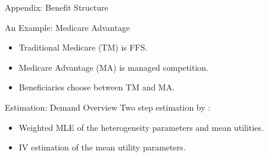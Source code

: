 \documentclass[professionalfonts, aspectratio=169]{beamer}
\begin{document}
\begin{frame}{Appendix: Benefit Structure}
  \begin{figure}
    \begin{figure}
      \centering
      \resizebox{0.8\textwidth}{!}{}
    \end{figure}
  \end{figure}
\end{frame}

\begin{frame}{An Example: Medicare Advantage}
  \begin{figure}
    \centering
    \resizebox{0.6\textwidth}{!}{}
  \end{figure}
  \begin{itemize}\small
    \item Traditional Medicare (TM) is FFS.
    \item Medicare Advantage (MA) is managed competition.
    \item Beneficiaries choose between TM and MA.
  \end{itemize}
  \end{frame}


  \begin{frame}{Estimation: Demand Overview}
    Two step estimation by \citet{goolsbeeConsumerGainsDirect2004}:
  
    \begin{itemize}
      \item Weighted MLE of the heterogeneity parameters and mean utilities.
      \item IV estimation of the mean utility parameters.
    \end{itemize}
  \end{frame}
  
\end{document}
